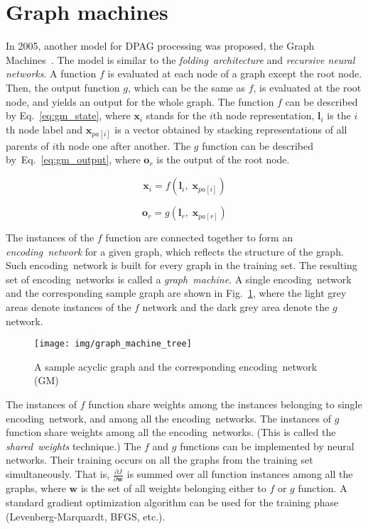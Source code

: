 \section{Graph machines}
In 2005, another model for DPAG processing was proposed, the Graph Machines~\cite{goulon2005learning}. The model is similar to the \emph{folding~architecture} and \emph{recursive neural networks}. A function $f$ is evaluated at each node of a graph except the root node. Then, the output function $g$, which can be the same as $f$, is evaluated at the root node, and yields an output for the whole graph. The function $f$ can be described by Eq.~\ref{eq:gm_state}, where $\bm{x}_i$ stands for the $i$th node representation, $\bm{l}_i$ is the $i$th node label and $\bm{x}_{pa[i]}$ is a vector obtained by stacking representations of all parents of $i$th node one after another. The $g$ function can be described by~Eq.~\ref{eq:gm_output}, where $\bm{o}_r$ is the output of the root node.

\begin{equation}
\bm{x}_i = f(\bm{l}_i, \; \bm{x}_{pa[i]})
\label{eq:gm_state}
\end{equation}

\begin{equation}
\bm{o}_r = g(\bm{l}_r, \; \bm{x}_{pa[r]})
\label{eq:gm_output}
\end{equation}

The instances of the $f$ function are connected together to form an \emph{encoding~network} for a given graph, which reflects the structure of the graph. Such encoding~network is built for every graph in the training set. The resulting set of encoding~networks is called a \emph{graph~machine}. A single encoding~network and the corresponding sample graph are shown in Fig.~\ref{fig:graph_machine_tree}, where the light grey areas denote instances of the $f$ network and the dark grey area denote the $g$ network.

\begin{figure}[h!]
\begin{center}
	\texttt{[image: img/graph\_machine\_tree]}
	\caption{A sample acyclic graph and the corresponding encoding~network (GM)}
	\label{fig:graph_machine_tree}
\end{center}
\end{figure}

The instances of $f$ function share weights among the instances belonging to single encoding~network, and among all the encoding~networks. The instances of $g$ function share weights among all the encoding~networks. (This is called the \emph{shared~weights} technique.) The $f$ and $g$ functions can be implemented by neural networks. Their training occurs on all the graphs from the training set simultaneously. That is, $\frac{\partial J}{\partial \bm{w}}$ is summed over all function instances among all the graphs, where $\bm{w}$ is the set of all weights belonging either to $f$ or $g$ function. A standard gradient optimization algorithm can be used for the training phase (Levenberg-Marquardt, BFGS, etc.).

